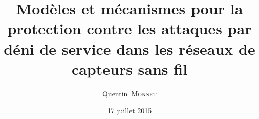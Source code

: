 \author{Quentin~\textsc{Monnet}}
\title{Modèles et mécanismes pour la protection contre les attaques par déni de service dans les réseaux de capteurs sans fil}
\date{17 juillet 2015}

